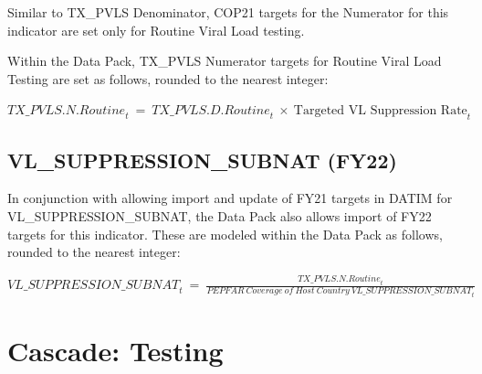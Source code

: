 \documentclass[
  openany]{book}
\begin{document}
Similar to TX\_PVLS Denominator, COP21 targets for the Numerator for this
indicator are set only for Routine Viral Load testing.

Within the Data Pack, TX\_PVLS Numerator targets for Routine Viral Load
Testing are set as follows, rounded to the nearest integer:

\begin{center} ${TX\_ PVLS.N.Routine}_{t}\  = \ {TX\_ PVLS.D.Routine}_{t}\  \times \ \text{Targeted\ VL\ Suppression\ Rate}_{t}$ \end{center}

\hypertarget{vl_suppression_subnat-fy22}{%
\subsection{VL\_SUPPRESSION\_SUBNAT (FY22)}\label{vl_suppression_subnat-fy22}}

In conjunction with allowing import and update of FY21 targets in DATIM
for VL\_SUPPRESSION\_SUBNAT, the Data Pack also allows import of FY22
targets for this indicator. These are modeled within the Data Pack as
follows, rounded to the nearest integer:

\begin{center} ${VL\_ SUPPRESSION\_ SUBNAT}_{t}\  = \ \frac{{TX\_ PVLS.N.Routine}_{t}}{{PEPFAR\ Coverage\ of\ Host\ Country\ VL\_ SUPPRESSION\_ SUBNAT}_{t}}$ \end{center}

\hypertarget{cascade-testing}{%
\section{Cascade: Testing}\label{cascade-testing}}
\end{document}
